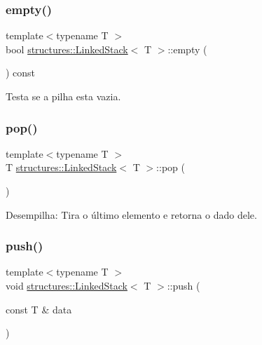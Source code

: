 \subsubsection{\texorpdfstring{empty()}{empty()}}
{\footnotesize\ttfamily template$<$typename T $>$ \\
bool \hyperlink{classstructures_1_1LinkedStack}{structures\+::\+Linked\+Stack}$<$ T $>$\+::empty (\begin{DoxyParamCaption}{ }\end{DoxyParamCaption}) const}



Testa se a pilha esta vazia. 

\mbox{\label{classstructures_1_1LinkedStack_a8ff0ba0de594ec26971bb259e1d28c3c}} 
\subsubsection{\texorpdfstring{pop()}{pop()}}
{\footnotesize\ttfamily template$<$typename T $>$ \\
T \hyperlink{classstructures_1_1LinkedStack}{structures\+::\+Linked\+Stack}$<$ T $>$\+::pop (\begin{DoxyParamCaption}{ }\end{DoxyParamCaption})}



Desempilha\+: Tira o último elemento e retorna o dado dele. 

\mbox{\label{classstructures_1_1LinkedStack_adb8c6b231298ac25b17ba692d510a3fc}} 
\subsubsection{\texorpdfstring{push()}{push()}}
{\footnotesize\ttfamily template$<$typename T $>$ \\
void \hyperlink{classstructures_1_1LinkedStack}{structures\+::\+Linked\+Stack}$<$ T $>$\+::push (\begin{DoxyParamCaption}\item[{const T \&}]{data }\end{DoxyParamCaption})}



